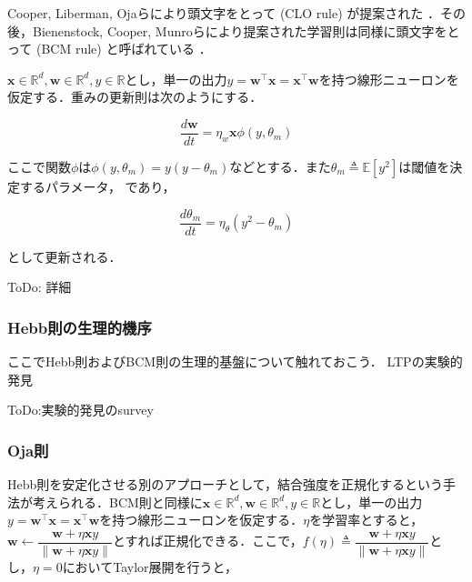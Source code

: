 Cooper, Liberman, Ojaらにより頭文字をとって\textbf{} (CLO rule) が提案された \cite{Cooper1979-wz}．その後，Bienenstock, Cooper, Munroらにより提案された学習則は同様に頭文字をとって\textbf{} (BCM rule) と呼ばれている\cite{Bienenstock1982-km} \cite{Cooper2012-ec}．

$\mathbf{x}\in \mathbb{R}^d, \mathbf{w}\in \mathbb{R}^d, y\in \mathbb{R}$とし，単一の出力$y = \mathbf{w}^\top \mathbf{x}=\mathbf{x}^\top \mathbf{w}$を持つ線形ニューロンを仮定する．重みの更新則は次のようにする．


\begin{equation}
\frac{d\mathbf{w}}{dt} = \eta_w \mathbf{x} \phi(y, \theta_m)
\end{equation}


ここで関数$\phi$は$\phi(y, \theta_m)=y(y-\theta_m)$などとする．また$\theta_m\triangleq\mathbb{E}[y^2]$は閾値を決定するパラメータ，\textbf{} であり，


\begin{equation}
\frac{d\theta_m}{dt} = \eta_{\theta} \left(y^2-\theta_m\right)
\end{equation}


として更新される．

ToDo: 詳細




\subsubsection{Hebb則の生理的機序}
ここでHebb則およびBCM則の生理的基盤について触れておこう．
LTPの実験的発見 \cite{Bliss1973-vj} \cite{Dudek1992-nz}

ToDo:実験的発見のsurvey
\subsubsection{Oja則}
Hebb則を安定化させる別のアプローチとして，結合強度を正規化するという手法が考えられる．BCM則と同様に$\mathbf{x}\in \mathbb{R}^d, \mathbf{w}\in \mathbb{R}^d, y\in \mathbb{R}$とし，単一の出力$y = \mathbf{w}^\top \mathbf{x}=\mathbf{x}^\top \mathbf{w}$を持つ線形ニューロンを仮定する．$\eta$を学習率とすると，$\mathbf{w}\leftarrow\dfrac{\mathbf{w}+\eta \mathbf{x}y}{\|\mathbf{w}+\eta \mathbf{x}y\|}$とすれば正規化できる．ここで，$f(\eta)\triangleq\dfrac{\mathbf{w}+\eta \mathbf{x}y}{\|\mathbf{w}+\eta \mathbf{x}y\|}$とし，$\eta=0$においてTaylor展開を行うと，


